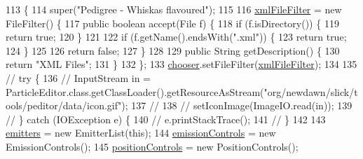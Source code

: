 \begin{DoxyCode}
113                                                                   \{
114         super(\textcolor{stringliteral}{"Pedigree - Whiskas flavoured"});
115 
116         \mbox{\hyperlink{classorg_1_1newdawn_1_1slick_1_1tools_1_1peditor_1_1_particle_editor_af35ea81b927d60eeb1ec4d20e9a299a3}{xmlFileFilter}} = \textcolor{keyword}{new} FileFilter() \{
117             \textcolor{keyword}{public} \textcolor{keywordtype}{boolean} accept(File f) \{
118                 \textcolor{keywordflow}{if} (f.isDirectory()) \{
119                     \textcolor{keywordflow}{return} \textcolor{keyword}{true};
120                 \}
121                 
122                 \textcolor{keywordflow}{if} (f.getName().endsWith(\textcolor{stringliteral}{".xml"})) \{
123                     \textcolor{keywordflow}{return} \textcolor{keyword}{true};
124                 \}
125                 
126                 \textcolor{keywordflow}{return} \textcolor{keyword}{false};
127             \}
128 
129             \textcolor{keyword}{public} String getDescription() \{
130                 \textcolor{keywordflow}{return} \textcolor{stringliteral}{"XML Files"};
131             \}
132         \};
133         \mbox{\hyperlink{classorg_1_1newdawn_1_1slick_1_1tools_1_1peditor_1_1_particle_editor_a7a921beab5e50d8482810cf42136ee17}{chooser}}.setFileFilter(\mbox{\hyperlink{classorg_1_1newdawn_1_1slick_1_1tools_1_1peditor_1_1_particle_editor_af35ea81b927d60eeb1ec4d20e9a299a3}{xmlFileFilter}});
134         
135 \textcolor{comment}{//      try \{}
136 \textcolor{comment}{//          InputStream in =
       ParticleEditor.class.getClassLoader().getResourceAsStream("org/newdawn/slick/tools/peditor/data/icon.gif");}
137 \textcolor{comment}{//          }
138 \textcolor{comment}{//          setIconImage(ImageIO.read(in));}
139 \textcolor{comment}{//      \} catch (IOException e) \{}
140 \textcolor{comment}{//          e.printStackTrace();}
141 \textcolor{comment}{//      \}}
142         
143         \mbox{\hyperlink{classorg_1_1newdawn_1_1slick_1_1tools_1_1peditor_1_1_particle_editor_adf3a8d24a0adf9e68e06a87f37ff378a}{emitters}} = \textcolor{keyword}{new} EmitterList(\textcolor{keyword}{this});
144         \mbox{\hyperlink{classorg_1_1newdawn_1_1slick_1_1tools_1_1peditor_1_1_particle_editor_ae90b330a4f8b1409927e2fb8dfa9129e}{emissionControls}} = \textcolor{keyword}{new} EmissionControls();
145         \mbox{\hyperlink{classorg_1_1newdawn_1_1slick_1_1tools_1_1peditor_1_1_particle_editor_a76c56fedfdc262b7480ca49713204d48}{positionControls}} = \textcolor{keyword}{new} PositionControls();

\end{DoxyCode}
